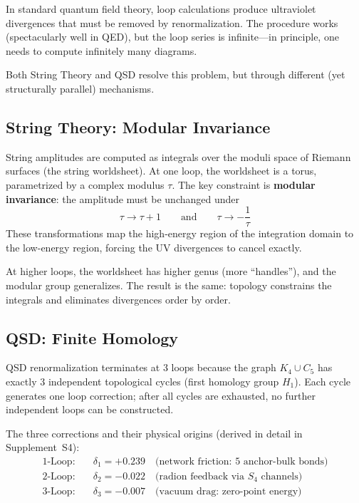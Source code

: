 \documentclass[11pt,a4paper]{article}
\theoremstyle{definition}
\begin{document}
In standard quantum field theory, loop calculations produce ultraviolet
divergences that must be removed by renormalization.  The procedure works
(spectacularly well in QED), but the loop series is infinite---in
principle, one needs to compute infinitely many diagrams.

Both String Theory and QSD resolve this problem, but through different
(yet structurally parallel) mechanisms.

\subsection{String Theory: Modular Invariance}

String amplitudes are computed as integrals over the moduli space of
Riemann surfaces (the string worldsheet).  At one loop, the worldsheet is
a torus, parametrized by a complex modulus $\tau$.  The key constraint is
\textbf{modular invariance}: the amplitude must be unchanged under
\begin{equation}
\tau \to \tau + 1 \qquad \text{and} \qquad \tau \to -\frac{1}{\tau}
\end{equation}
These transformations map the high-energy region of the integration domain
to the low-energy region, forcing the UV divergences to cancel exactly.

At higher loops, the worldsheet has higher genus (more ``handles''), and
the modular group generalizes.  The result is the same: topology constrains
the integrals and eliminates divergences order by order.

\subsection{QSD: Finite Homology}

QSD renormalization terminates at 3 loops because the graph $K_4 \cup C_5$
has exactly 3 independent topological cycles (first homology group $H_1$).
Each cycle generates one loop correction; after all cycles are exhausted,
no further independent loops can be constructed.

The three corrections and their physical origins (derived in detail in
Supplement~S4):
\begin{align}
\text{1-Loop:} &\quad \delta_1 = +0.239 \quad \text{(network friction: 5 anchor-bulk bonds)} \\
\text{2-Loop:} &\quad \delta_2 = -0.022 \quad \text{(radion feedback via $S_4$ channels)} \\
\text{3-Loop:} &\quad \delta_3 = -0.007 \quad \text{(vacuum drag: zero-point energy)}
\end{align}
\end{document}
